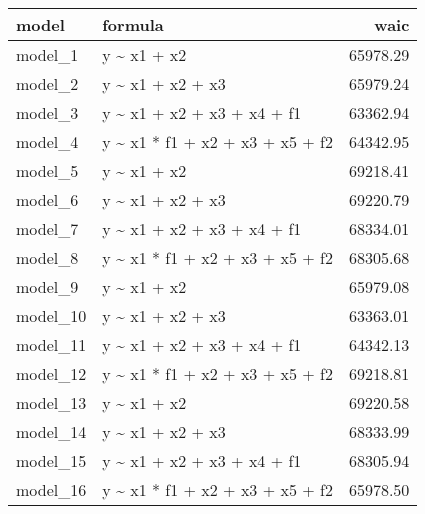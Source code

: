 
\begin{tabular}{llr}
\toprule
model & formula & waic\\
\midrule
model\_1 & y \textasciitilde{} x1 + x2 & 65978.29\\
model\_2 & y \textasciitilde{} x1 + x2 + x3 & 65979.24\\
model\_3 & y \textasciitilde{} x1 + x2 + x3 + x4 + f1 & 63362.94\\
model\_4 & y \textasciitilde{} x1 * f1 + x2 + x3 + x5 + f2 & 64342.95\\
model\_5 & y \textasciitilde{} x1 + x2 & 69218.41\\
\addlinespace
model\_6 & y \textasciitilde{} x1 + x2 + x3 & 69220.79\\
model\_7 & y \textasciitilde{} x1 + x2 + x3 + x4 + f1 & 68334.01\\
model\_8 & y \textasciitilde{} x1 * f1 + x2 + x3 + x5 + f2 & 68305.68\\
model\_9 & y \textasciitilde{} x1 + x2 & 65979.08\\
model\_10 & y \textasciitilde{} x1 + x2 + x3 & 63363.01\\
\addlinespace
model\_11 & y \textasciitilde{} x1 + x2 + x3 + x4 + f1 & 64342.13\\
model\_12 & y \textasciitilde{} x1 * f1 + x2 + x3 + x5 + f2 & 69218.81\\
model\_13 & y \textasciitilde{} x1 + x2 & 69220.58\\
model\_14 & y \textasciitilde{} x1 + x2 + x3 & 68333.99\\
model\_15 & y \textasciitilde{} x1 + x2 + x3 + x4 + f1 & 68305.94\\
\addlinespace
model\_16 & y \textasciitilde{} x1 * f1 + x2 + x3 + x5 + f2 & 65978.50\\
\bottomrule
\end{tabular}
